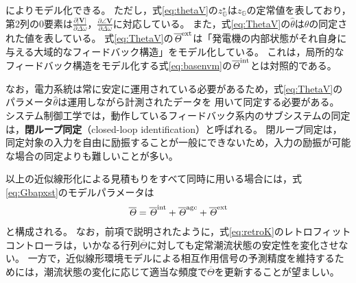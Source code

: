 \documentclass[tombow,dvipdfmx]{corona-a5-1.1}
\begin{document}
によりモデル化できる。
ただし，式\ref{eq:thetaV}の$z_{\mathds G}^{\star}$は$z_{\mathds G}$の定常値を表しており，
第2列の0要素は$\tfrac{\partial |\bm{V}| }{\partial \Delta \omega}$，$\tfrac{\partial \angle \bm{V} }{\partial \Delta \omega}$に対応している。
また，式\ref{eq:ThetaV}の$\hat{\theta}$は$\theta$の同定された値を表している。
式\ref{eq:ThetaV}の$\overline{\mathit{\Theta}}^{\rm ext}$は「発電機の内部状態がそれ自身に与える大域的なフィードバック構造」をモデル化している。
これは，局所的なフィードバック構造をモデル化する式\ref{eq:basenvm}の$\overline{\mathit{\Theta}}^{\rm int}$とは対照的である。

なお，電力系統は常に安定に運用されている必要があるため，式\ref{eq:ThetaV}のパラメータ$\hat{\theta}$は運用しながら計測されたデータを
用いて同定する必要がある。
システム制御工学では，動作しているフィードバック系内のサブシステムの同定は，\textbf{閉ループ同定}（closed-loop identification）と呼ばれる\cite{ljung1998system}。
閉ループ同定は，同定対象の入力を自由に励振することが一般にできないため，入力の励振が可能な場合の同定よりも難しいことが多い。



以上の近似線形化による見積もりをすべて同時に用いる場合には，式\ref{eq:Gbapxst}のモデルパラメータは
\begin{align}\label{eq:Thetasum}
\overline{\mathit{\Theta}}=
\overline{\mathit{\Theta}}^{\rm int}+
\overline{\mathit{\Theta}}^{\rm agc}+
\overline{\mathit{\Theta}}^{\rm ext}
\end{align}
と構成される。
なお，前項で説明されたように，式\ref{eq:retroK}のレトロフィットコントローラは，いかなる行列$\overline{\mathit{\Theta}}$に対しても定常潮流状態の安定性を変化させない。
一方で，近似線形環境モデルによる相互作用信号の予測精度を維持するためには，潮流状態の変化に応じて適当な頻度で$\overline{\mathit{\Theta}}$を更新することが望ましい。
\end{document}
